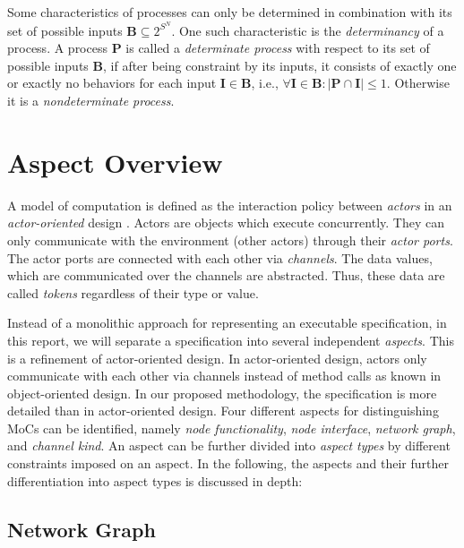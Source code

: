 
Some characteristics of processes can only be determined in combination with
its set of possible inputs $\mathbf{B} \subseteq 2^{S^N}$.
One such characteristic is the \emph{determinancy} of a process.
A process $\mathbf{P}$ is called a \emph{determinate process} with respect
to its set of possible inputs $\mathbf{B}$, if after being
constraint by its inputs, it consists of exactly one or exactly
no behaviors for each input $\mathbf{I} \in \mathbf{B}$,
i.e., $\forall{\mathbf{I} \in \mathbf{B}}: |\mathbf{P} \cap \mathbf{I}| \le 1$.
Otherwise it is a \emph{nondeterminate process}.


\section{Aspect Overview}\label{aspect-overview}

A model of computation \cite{Lee98,embsft:2002} is defined as the
interaction policy between \emph{actors} in an \emph{actor-oriented} design
\cite{agha97abstracting:1997}. Actors are objects which execute concurrently. They can only
communicate with the environment (other actors) through their \emph{actor ports}.
The actor ports are connected with each other via \emph{channels}.
The data values, which are communicated over the channels
are abstracted. Thus, these data are called \emph{tokens} regardless
of their type or value.

Instead of a monolithic approach for representing an executable specification,
in this report, we will separate a specification into several
independent \emph{aspects}.
This is a refinement of actor-oriented design.
In actor-oriented design, actors only
communicate with each other via channels instead of method calls as known
in object-oriented design. In our proposed methodology, the specification is more
detailed than in actor-oriented design.
Four different aspects for distinguishing MoCs can be identified,
namely \emph{node functionality}, \emph{node interface}, \emph{network graph}, and
\emph{channel kind}. An aspect can be further divided into
\emph{aspect types} by different constraints imposed on an aspect.
In the following, the aspects and their further
differentiation into aspect types is discussed in depth:

\subsection{Network Graph}\label{network-graph} 

